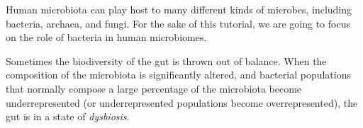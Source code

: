 %
Human microbiota can play host to many different kinds of microbes, including bacteria, archaea, and fungi. For the sake of this tutorial, we are going to focus on the role of bacteria in human microbiomes.

Sometimes the biodiversity of the gut is thrown out of balance. When the composition of the microbiota is significantly altered, and bacterial populations that normally compose a large percentage of the microbiota become underrepresented (or underrepresented populations become overrepresented), the gut is in a state of \textit{dysbiosis}.
%
%
